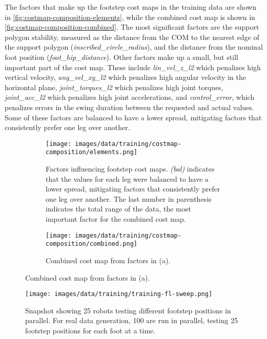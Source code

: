 The factors that make up the footstep cost maps in the training data
are shown in \autoref{fig:costmap-composition-elements}, while the
combined cost map is shown in \autoref{fig:costmap-composition-combined}.
The most significant factors are the support polygon stability,
measured as the distance from the COM to the nearest edge of the
support polygon (\textit{inscribed\_circle\_radius}), and the
distance from the nominal foot position
(\textit{foot\_hip\_distance}). Other factors make up a small, but
still important part of the cost map. These include
\textit{lin\_vel\_z\_l2} which penalizes high vertical velocity,
\textit{ang\_vel\_xy\_l2} which penalizes high angular velocity in
the horizontal plane, \textit{joint\_torques\_l2} which penalizes
high joint torques, \textit{joint\_acc\_l2} which penalizes high
joint accelerations, and \textit{control\_error}, which penalizes
errors in the swing duration between the requested and actual values.
Some of these factors are balanced to have a lower spread, mitigating
factors that consistently prefer one leg over another.

\begin{figure}
  \centering
  \begin{subfigure}[T]{0.65\textwidth}
    \centering
    \texttt{[image: images/data/training/costmap-composition/elements.png]}
    \caption{Factors influencing footstep cost maps. \textit{(bal)}
      indicates that the values for each leg were balanced to have a
      lower spread, mitigating factors that consistently prefer one leg
      over another. The last number in parenthesis indicates the total
    range of the data, the most important factor for the combined cost map.}
    \label{fig:data-costmap-composition-elements}
  \end{subfigure}
  \hfill
  \begin{subfigure}[T]{0.3\textwidth}
    \centering
    \texttt{[image: images/data/training/costmap-composition/combined.png]}
    \caption{Combined cost map from factors in (a).}
    \label{fig:data-costmap-composition-combined}
  \end{subfigure}
  \hfill
\end{figure}

\begin{figure}
  \centering
  \texttt{[image: images/data/training/training-fl-sweep.png]}
  \caption{Snapshot showing 25 robots testing different footstep
    positions in parallel. For real data generation, 100 are run in
  parallel, testing 25 footstep positions for each foot at a time.}
\end{figure}

